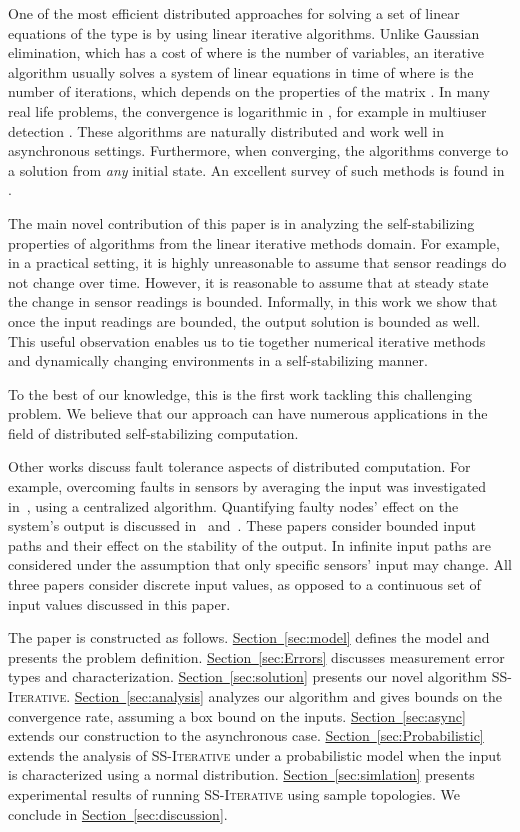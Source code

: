 \documentclass[preprint,12pt]{elsarticle}
\newcommand{\namedref}[2]{\hyperref[#2]{#1~\ref*{#2}}}
\newcommand{\sectionref}[1]{\namedref{Section}{#1}}
\newcommand{\syncAlg}{\textsc{SS-Iterative}\xspace}
\begin{document}
One of the most efficient distributed approaches for solving a set
of linear equations of the type  is by using linear
iterative algorithms. Unlike Gaussian elimination, which has a
cost of  where  is the number of variables, an
iterative algorithm usually solves a system of linear equations in
time of  where  is the number of iterations, which depends
on the properties of the matrix . In many real life problems, the convergence
is logarithmic in , for example in multiuser detection \cite{Allerton}.
These algorithms are naturally distributed and work well in asynchronous settings. Furthermore,
when converging, the algorithms converge to a solution from {\em
any} initial state. An excellent survey of such methods is found
in \cite{BibDB:BookBertsekasTsitsiklis}.

The main novel contribution of this paper is in analyzing
the self-stabilizing properties of
algorithms from the linear iterative methods domain. For example, in a practical setting, it is
highly unreasonable to assume that sensor readings do not change
over time. However, it is reasonable to assume that at steady
state the change in sensor readings is bounded. Informally, in
this work we show that once the input readings are bounded, the
output solution is bounded as well. This useful observation
enables us to tie together numerical iterative methods and
dynamically changing environments in a self-stabilizing manner.

To the best of our knowledge, this is the
first work tackling this challenging problem. We believe that our
approach can have numerous applications in the field of
distributed self-stabilizing computation.

Other works discuss fault tolerance aspects of distributed
computation. For example, overcoming faults in sensors by
averaging the input was investigated in~\cite{SensorFailures},
using a centralized algorithm. Quantifying faulty nodes'
effect on the system's output is discussed in~\cite{BinaryRept}
and~\cite{MultiValRept}. These papers consider bounded input paths
and their effect on the stability of the output. In
\cite{RepCons-PODC08} infinite input paths are considered under
the assumption that only specific sensors' input may change. All
three papers consider discrete input values, as opposed to a
continuous set of input values discussed in this paper.


The paper is constructed as follows.
\sectionref{sec:model} defines the model and presents the problem definition. \sectionref{sec:Errors} discusses measurement error types and characterization. \sectionref{sec:solution}
presents our novel algorithm \syncAlg. \sectionref{sec:analysis}
analyzes our algorithm and gives bounds on the convergence rate, assuming a box bound on the inputs. \sectionref{sec:async} extends our construction to the asynchronous case. \sectionref{sec:Probabilistic} extends the
analysis of \syncAlg under a probabilistic model when the input is characterized using a normal distribution.
\sectionref{sec:simlation} presents experimental results of
running \syncAlg using sample topologies. We conclude in
\sectionref{sec:discussion}.
\end{document}
